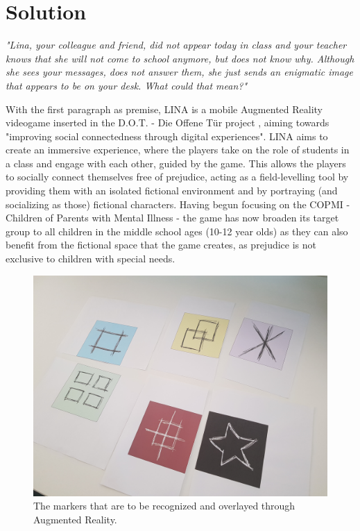 \section{Solution}
\label{sec: Methodology}
\par \textit{"Lina, your colleague and friend, did not appear today in class and your teacher knows that she will not come to school anymore, but does not know why. Although she sees your messages, does not answer them, she just sends an enigmatic image that appears to be on your desk. What could that mean?"}
\par With the first paragraph as premise, LINA is a mobile Augmented Reality videogame inserted in the D.O.T. - Die Offene Tür project \cite{dot_project_website_2017}, aiming towards "improving social connectedness through digital experiences". LINA aims to create an immersive experience, where the players take on the role of students in a class and engage with each other, guided by the game. This allows the players to socially connect themselves free of prejudice, acting as a field-levelling tool by providing them with an isolated fictional environment and by portraying (and socializing as those) fictional characters. Having begun focusing on the COPMI - Children of Parents with Mental Illness - the game has now broaden its target group to all children in the middle school ages (10-12 year olds) as they can also benefit from the fictional space that the game creates, as prejudice is not exclusive to children with special needs.

\begin{figure}
	\centering
	\includegraphics[scale = 0.05]{newIcons.jpg}
	\caption{The markers that are to be recognized and overlayed through Augmented Reality.}
	\label{fig:icons}
\end{figure}



